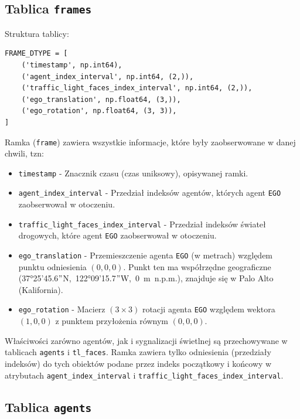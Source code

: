 \newpage

\subsection{Tablica \texttt{frames}}

\noindent
Struktura tablicy:

\begin{verbatim}
FRAME_DTYPE = [
    ('timestamp', np.int64),
    ('agent_index_interval', np.int64, (2,)),
    ('traffic_light_faces_index_interval', np.int64, (2,)),
    ('ego_translation', np.float64, (3,)),
    ('ego_rotation', np.float64, (3, 3)),
]
\end{verbatim}

\noindent
Ramka (\texttt{frame}) zawiera wszystkie informacje, które były zaobserwowane w danej chwili, tzn:

\begin{itemize}
    \setlength{\itemsep}{1pt}
    \setlength{\parskip}{0.2em}
    \setlength{\parsep}{0.2em}
    \item \texttt{timestamp} - Znacznik czasu (czas uniksowy), opisywanej ramki.
    \item \texttt{agent\_index\_interval} - Przedział indeksów agentów, których agent \texttt{EGO} zaobserwował w otoczeniu.
    \item \texttt{traffic\_light\_faces\_index\_interval} - Przedział indeksów świateł drogowych, które agent \texttt{EGO} zaobserwował w otoczeniu.
    \item \texttt{ego\_translation} - Przemieszczenie agenta \texttt{EGO} (w metrach) względem punktu odniesienia $(0, 0, 0)$. Punkt ten ma współrzędne geograficzne \mbox{(37°25'45.6$"$N, 122°09'15.7$"$W, 0 m n.p.m.)}, znajduje się w Palo Alto (Kalifornia).
    \item \texttt{ego\_rotation} - Macierz $(3\times3)$ rotacji agenta \texttt{EGO} względem wektora $(1, 0, 0)$ z punktem przyłożenia równym $(0, 0, 0)$.
\end{itemize}

\noindent
Właściwości zarówno agentów, jak i sygnalizacji świetlnej są przechowywane w tablicach \texttt{agents} i \texttt{tl\_faces}. Ramka zawiera tylko odniesienia (przedziały indeksów) do tych obiektów podane przez indeks początkowy i końcowy w atrybutach \texttt{agent\_index\_interval} i \texttt{traffic\_light\_faces\_index\_interval}.

\subsection{Tablica \texttt{agents}}

